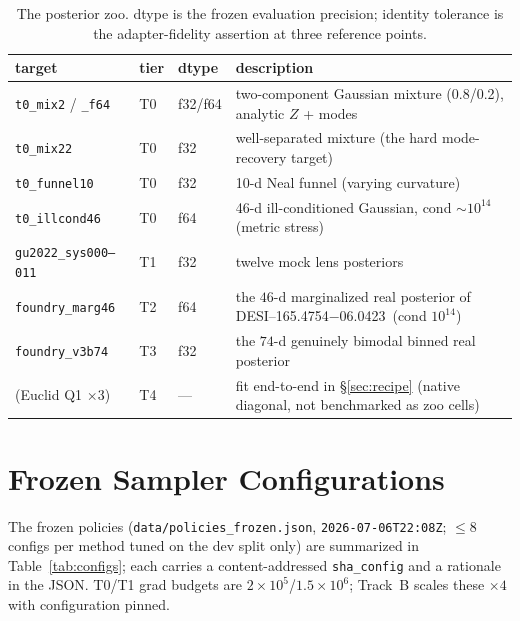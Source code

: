 \documentclass[11pt,letterpaper]{article}
\newcommand{\foundry}{DESI--165.4754$-$06.0423}
\newcommand{\dfile}[1]{\texttt{#1}}
\begin{document}
\begin{table}[ht]
\centering
\caption{The posterior zoo. dtype is the frozen evaluation precision; identity
tolerance is the adapter-fidelity assertion at three reference points.}
\label{tab:zoo}
\small
\begin{tabular}{lllp{}}
\toprule
target & tier & dtype & description \\
\midrule
\dfile{t0\_mix2} / \dfile{\_f64} & T0 & f32/f64 & two-component Gaussian mixture (0.8/0.2), analytic $Z$ + modes \\
\dfile{t0\_mix22}     & T0 & f32 & well-separated mixture (the hard mode-recovery target) \\
\dfile{t0\_funnel10}  & T0 & f32 & 10-d Neal funnel (varying curvature) \\
\dfile{t0\_illcond46} & T0 & f64 & 46-d ill-conditioned Gaussian, cond $\sim$$10^{14}$ (metric stress) \\
\dfile{gu2022\_sys000--011} & T1 & f32 & twelve \citet{gu2022gigalens} mock lens posteriors \\
\dfile{foundry\_marg46} & T2 & f64 & the $46$-d marginalized real posterior of \foundry\ (cond $10^{14}$) \\
\dfile{foundry\_v3b74}  & T3 & f32 & the $74$-d genuinely bimodal binned real posterior \\
(Euclid Q1 $\times$3) & T4 & --- & fit end-to-end in \S\ref{sec:recipe} (native diagonal, not benchmarked as zoo cells) \\
\bottomrule
\end{tabular}
\end{table}

\section{Frozen Sampler Configurations}
\label{app:configs}

The frozen policies (\dfile{data/policies\_frozen.json},
\texttt{2026-07-06T22:08Z}; $\le8$ configs per method tuned on the dev split
only) are summarized in Table~\ref{tab:configs}; each carries a
content-addressed \texttt{sha\_config} and a rationale in the JSON. T0/T1 grad
budgets are $2\times10^5$/$1.5\times10^6$; Track~B scales these $\times4$ with
configuration pinned.
\end{document}
